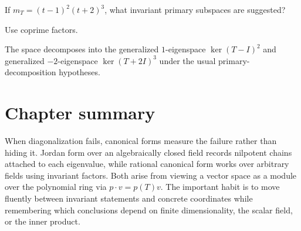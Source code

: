 \begin{exercise}\label{exr:i12-expand-16}
If \(m_T=(t-1)^2(t+2)^3\), what invariant primary subspaces are suggested?
\end{exercise}
\begin{hint}
Use coprime factors.
\end{hint}
\begin{solution}
The space decomposes into the generalized \(1\)-eigenspace \(\ker(T-I)^2\) and generalized \(-2\)-eigenspace \(\ker(T+2I)^3\) under the usual primary-decomposition hypotheses.
\end{solution}
\section*{Chapter summary}
When diagonalization fails, canonical forms measure the failure rather than hiding it. Jordan form over an algebraically closed field records nilpotent chains attached to each eigenvalue, while rational canonical form works over arbitrary fields using invariant factors. Both arise from viewing a vector space as a module over the polynomial ring via $p\cdot v=p(T)v$.
The important habit is to move fluently between invariant statements and concrete coordinates while remembering which conclusions depend on finite dimensionality, the scalar field, or the inner product.
